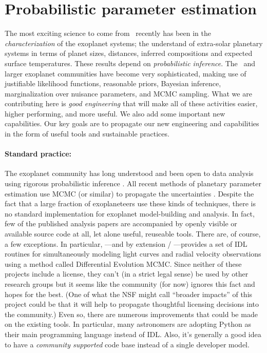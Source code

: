 \documentclass[letterpaper,12pt,preprint]{hack_aastex}
\begin{document}
\section{Probabilistic parameter estimation}

The most exciting science to come from \Kepler\ recently has been in
the \emph{characterization} of the exoplanet systems; the understand
of extra-solar planetary systems in terms of planet sizes, distances,
inferred compositions and expected surface temperatures.  These
results depend on \emph{probabilistic inference}.  The \Kepler\ and
larger exoplanet communities have become very sophisticated, making
use of justifiable likelihood functions, reasonable priors, Bayesian
inference, marginalization over nuisance parameters, and MCMC
sampling.  What we are contributing here is \emph{good engineering}
that will make all of these activities easier, higher performing, and
more useful.  We also add some important new capabilities.  Our key
goals are to propagate our new engineering and capabilities in the
form of useful tools and sustainable practices.

\paragraph{Standard practice:}
The exoplanet community has long understood and been open to data analysis
using rigorous probabilistic inference \citep[][for example]{ford}.
All recent methods of planetary parameter estimation use MCMC (or similar) to
propagate the uncertainties \citep[][to name only a few]{barclay,dressing,%
kepler5,kepler4}.
Despite the fact that a large fraction of exoplaneteers use these kinds of techniques, there is no standard
implementation for exoplanet model-building and analysis.
In fact, few of the published analysis papers are accompanied by openly visible or available source code at all, let alone useful, reuseable tools.
There are, of course, a few exceptions.
In particular,  \citep{exofast}---and by extension
/ \citep{autokep}---provides a set of IDL
routines for simultaneously modeling light curves and radial velocity
observations using a method called Differential Evolution MCMC.\@
Since neither of these projects include a license, they can't (in a strict legal sense) be used
by other research groups but it seems like the community (for now) ignores this fact and
hopes for the best.
(One of what the NSF might call ``broader impacts'' of this project could be that it will help to propagate thoughtful licensing decisions into the community.)
Even so, there are numerous improvements that could be made on the existing
tools.
In particular, many astronomers are adopting Python as their main programming
language instead of IDL.\@
Also, it's generally a good idea to have a \emph{community supported} code
base instead of a single developer model.
\end{document}
